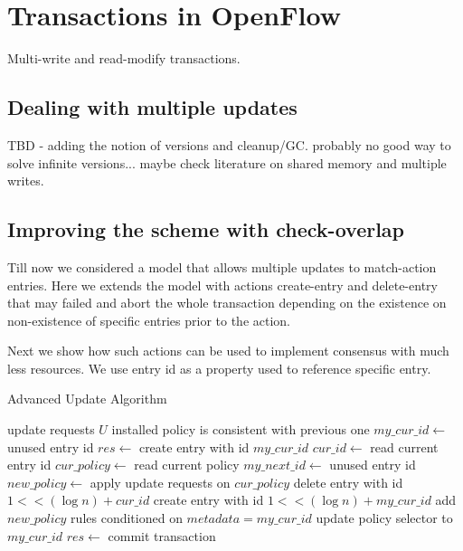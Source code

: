 \documentclass[conference]{sigcomm-alternate}
\begin{document}
\section{Transactions in OpenFlow}\label{sec:sync}

Multi-write and read-modify transactions.

\subsection{Dealing with multiple updates}

TBD - adding the notion of versions and cleanup/GC. probably no good way to solve infinite versions... maybe check literature on shared memory and multiple writes.


\subsection{Improving the scheme with check-overlap}\label{sec:todo}
Till now we considered a model that allows multiple updates to match-action entries. Here we extends the model with actions create-entry and delete-entry that may failed and abort the whole transaction depending on the existence on non-existence of specific entries prior to the action.

Next we show how such actions can be used to implement consensus with much less resources. We use entry id as a property used to reference specific entry.

\begin{algorithm}[t]
    \caption{Advanced Update Algorithm}
    \label{alg:template}
    \begin{algorithmic}[1]
    \Require update requests $U$
    \Ensure installed policy is consistent with previous one
		\Repeat
			\State $my\_cur\_id\gets$ unused entry id
    		\State $res \gets $ create entry with id $my\_cur\_id$
    \EndIf
 		\Repeat
 			\State $cur\_id\gets$ read current entry id
 			\State $cur\_policy\gets$ read current policy
 			\State $my\_next\_id\gets$ unused entry id
 			\State $new\_policy\gets$ apply update requests on $cur\_policy$
 			\startTransaction
	 			\State delete entry with id $1<<(\log n) + cur\_id$
	 			\State create entry with id $1<<(\log n) + my\_cur\_id$
	 			\State add $new\_policy$ rules conditioned on $metadata=my\_cur\_id$
	 			\State update policy selector to $my\_cur\_id$
 			\endTransaction
     		\State $res \gets $ commit transaction

    \end{algorithmic}
\end{algorithm}
\end{document}
